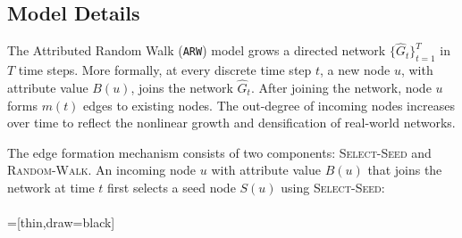 
\subsection{Model Details}
\label{sub:Model Description}


The Attributed Random Walk (\texttt{ARW}) model grows a directed network $\{\hat{G}_t\}^T_{t=1}$
in $T$ time steps.
More formally, at every discrete time step $t$, a
new node $u$, with attribute value $B(u)$, joins the network $\hat{G}_t$.
After joining the network, node $u$ forms $m(t)$ edges to
existing nodes.
The out-degree of incoming nodes increases over time to
reflect the nonlinear growth and densification of real-world networks.

The edge formation mechanism consists of two components: \textsc{Select-Seed} and
\textsc{Random-Walk}. An incoming node $u$ with attribute value $B(u)$ that joins the
network at time $t$ first selects a seed node $S(u)$ using \textsc{Select-Seed}:
\\\\
=[thin,draw=black]



